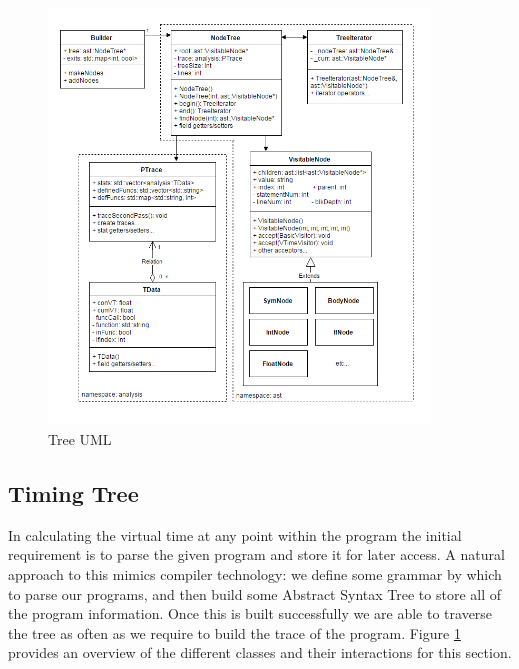 \documentclass[11pt, abstracton, twoside, titlepage=true]{scrartcl}
\begin{document}
\begin{figure}[h!]
	\centering
	\includegraphics[width=0.9\textwidth]{images/timing.jpg}
	\caption{Tree UML} \label{tree}
\end{figure}
\newpage

\subsection{Timing Tree}
In calculating the virtual time at any point within the program the initial 
requirement is to parse the given program and store it for later access. A 
natural approach to this mimics compiler technology: we define some
grammar by which to parse our programs, and then build some Abstract Syntax Tree 
to store all of the program information. Once this 
is built successfully we are able to traverse the tree as often as we require 
to build the trace of the program. Figure \ref{tree} provides an overview of the 
different classes and their interactions for this section.
\end{document}
